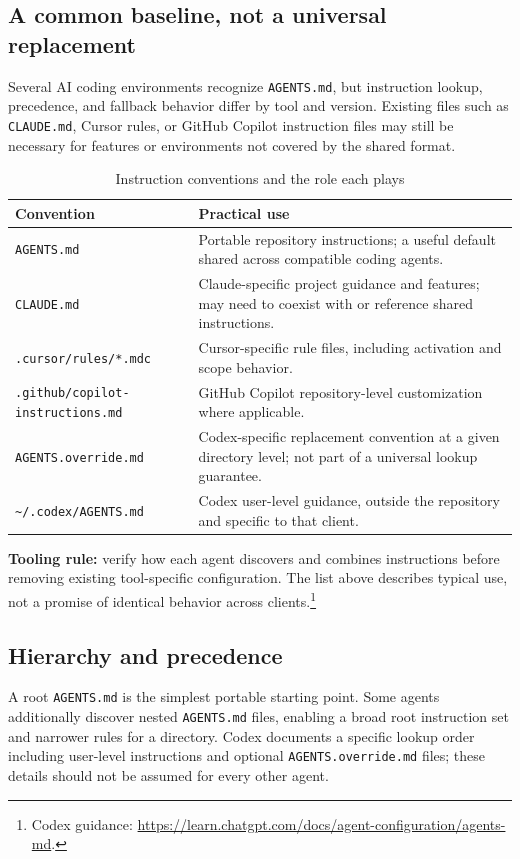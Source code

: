 \documentclass[11pt,letterpaper]{article}
\begin{document}
\subsection{A common baseline, not a universal replacement}
Several AI coding environments recognize \texttt{AGENTS.md}, but instruction lookup, precedence, and fallback behavior differ by tool and version. Existing files such as \texttt{CLAUDE.md}, Cursor rules, or GitHub Copilot instruction files may still be necessary for features or environments not covered by the shared format.

\begin{table}[htbp]
\centering
\small
\caption{Instruction conventions and the role each plays}
\label{tab:formats}
\begin{tabularx}{\textwidth}{@{}p{}X@{}}
\toprule
\textbf{Convention} & \textbf{Practical use} \\
\midrule
\texttt{AGENTS.md} & Portable repository instructions; a useful default shared across compatible coding agents. \\
\texttt{CLAUDE.md} & Claude-specific project guidance and features; may need to coexist with or reference shared instructions. \\
\texttt{.cursor/rules/*.mdc} & Cursor-specific rule files, including activation and scope behavior. \\
\texttt{.github/copilot-}\newline\texttt{instructions.md} & GitHub Copilot repository-level customization where applicable. \\
\texttt{AGENTS.override.md} & Codex-specific replacement convention at a given directory level; not part of a universal lookup guarantee. \\
\texttt{\~{}/.codex/AGENTS.md} & Codex user-level guidance, outside the repository and specific to that client. \\
\bottomrule
\end{tabularx}
\end{table}

\textbf{Tooling rule:} verify how each agent discovers and combines instructions before removing existing tool-specific configuration. The list above describes typical use, not a promise of identical behavior across clients.\footnote{Codex guidance: \url{https://learn.chatgpt.com/docs/agent-configuration/agents-md}.}

\subsection{Hierarchy and precedence}
A root \texttt{AGENTS.md} is the simplest portable starting point. Some agents additionally discover nested \texttt{AGENTS.md} files, enabling a broad root instruction set and narrower rules for a directory. Codex documents a specific lookup order including user-level instructions and optional \texttt{AGENTS.override.md} files; these details should not be assumed for every other agent.
\end{document}
